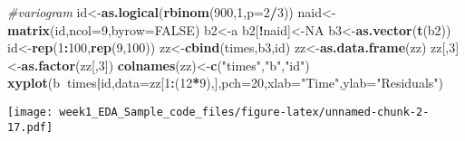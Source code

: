 \documentclass[]{article}
\newenvironment{Shaded}{\begin{snugshade}}{\end{snugshade}}
\newcommand{\CommentTok}[1]{\textcolor[rgb]{0.56,0.35,0.01}{\textit{#1}}}
\newcommand{\ControlFlowTok}[1]{\textcolor[rgb]{0.13,0.29,0.53}{\textbf{#1}}}
\newcommand{\DataTypeTok}[1]{\textcolor[rgb]{0.13,0.29,0.53}{#1}}
\newcommand{\DecValTok}[1]{\textcolor[rgb]{0.00,0.00,0.81}{#1}}
\newcommand{\FloatTok}[1]{\textcolor[rgb]{0.00,0.00,0.81}{#1}}
\newcommand{\KeywordTok}[1]{\textcolor[rgb]{0.13,0.29,0.53}{\textbf{#1}}}
\newcommand{\NormalTok}[1]{#1}
\newcommand{\OperatorTok}[1]{\textcolor[rgb]{0.81,0.36,0.00}{\textbf{#1}}}
\newcommand{\OtherTok}[1]{\textcolor[rgb]{0.56,0.35,0.01}{#1}}
\newcommand{\StringTok}[1]{\textcolor[rgb]{0.31,0.60,0.02}{#1}}
\begin{document}
\begin{Shaded}
\begin{Highlighting}[]
\CommentTok{#variogram}
\NormalTok{id<-}\KeywordTok{as.logical}\NormalTok{(}\KeywordTok{rbinom}\NormalTok{(}\DecValTok{900}\NormalTok{,}\DecValTok{1}\NormalTok{,}\DataTypeTok{p=}\DecValTok{2}\OperatorTok{/}\DecValTok{3}\NormalTok{))}
\NormalTok{naid<-}\KeywordTok{matrix}\NormalTok{(id,}\DataTypeTok{ncol=}\DecValTok{9}\NormalTok{,}\DataTypeTok{byrow=}\OtherTok{FALSE}\NormalTok{)}
\NormalTok{b2<-a}
\NormalTok{b2[}\OperatorTok{!}\NormalTok{naid]<-}\OtherTok{NA}
\NormalTok{b3<-}\KeywordTok{as.vector}\NormalTok{(}\KeywordTok{t}\NormalTok{(b2))}
\NormalTok{id<-}\KeywordTok{rep}\NormalTok{(}\DecValTok{1}\OperatorTok{:}\DecValTok{100}\NormalTok{,}\KeywordTok{rep}\NormalTok{(}\DecValTok{9}\NormalTok{,}\DecValTok{100}\NormalTok{))}
\NormalTok{zz<-}\KeywordTok{cbind}\NormalTok{(times,b3,id)}
\NormalTok{zz<-}\KeywordTok{as.data.frame}\NormalTok{(zz)}
\NormalTok{zz[,}\DecValTok{3}\NormalTok{]<-}\KeywordTok{as.factor}\NormalTok{(zz[,}\DecValTok{3}\NormalTok{])}
\KeywordTok{colnames}\NormalTok{(zz)<-}\KeywordTok{c}\NormalTok{(}\StringTok{"times"}\NormalTok{,}\StringTok{"b"}\NormalTok{,}\StringTok{"id"}\NormalTok{)}
\KeywordTok{xyplot}\NormalTok{(b}\OperatorTok{~}\NormalTok{times}\OperatorTok{|}\NormalTok{id,}\DataTypeTok{data=}\NormalTok{zz[}\DecValTok{1}\OperatorTok{:}\NormalTok{(}\DecValTok{12}\OperatorTok{*}\DecValTok{9}\NormalTok{),],}\DataTypeTok{pch=}\DecValTok{20}\NormalTok{,}\DataTypeTok{xlab=}\StringTok{"Time"}\NormalTok{,}\DataTypeTok{ylab=}\StringTok{"Residuals"}\NormalTok{)}
\end{Highlighting}
\end{Shaded}

\texttt{[image: week1\_EDA\_Sample\_code\_files/figure-latex/unnamed-chunk-2-17.pdf]}

\begin{Shaded}
\end{Shaded}
\end{document}
